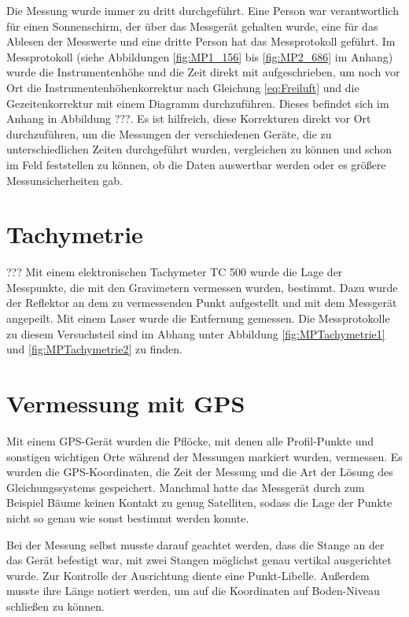 Die Messung wurde immer zu dritt durchgeführt. Eine Person war verantwortlich für einen Sonnenschirm, der über das Messgerät gehalten wurde, eine für das Ablesen der Messwerte 
und eine dritte Person hat das Messprotokoll geführt. Im Messprotokoll (siehe Abbildungen \ref{fig:MP1_156} bis \ref{fig:MP2_686} im Anhang) wurde die Instrumentenhöhe und die Zeit direkt mit aufgeschrieben, um noch vor Ort die Instrumentenhöhenkorrektur nach Gleichung \eqref{eq:Freiluft} und die Gezeitenkorrektur mit einem Diagramm durchzuführen. Dieses befindet sich im Anhang in Abbildung ???. Es ist hilfreich, diese Korrekturen direkt vor Ort durchzuführen, um die Messungen der verschiedenen Geräte, die zu unterschiedlichen Zeiten durchgeführt wurden, vergleichen zu können und schon im Feld feststellen zu können, ob die Daten auswertbar werden oder es größere Messunsicherheiten gab.

\section{Tachymetrie}???
Mit einem elektronischen Tachymeter TC 500 wurde die Lage der Messpunkte, die mit den Gravimetern vermessen wurden, bestimmt. Dazu wurde der Reflektor an dem zu vermessenden Punkt aufgestellt und mit dem Messgerät angepeilt. Mit einem Laser wurde die Entfernung gemessen. Die Messprotokolle zu diesem Versuchsteil sind im Abhang unter Abbildung \ref{fig:MPTachymetrie1} und \ref{fig:MPTachymetrie2} zu finden.

\section{Vermessung mit GPS}

Mit einem GPS-Gerät wurden die Pflöcke, mit denen alle Profil-Punkte und sonstigen wichtigen Orte während der Messungen markiert wurden, vermessen. Es wurden die GPS-Koordinaten, die Zeit der Messung und die Art der Lösung des Gleichungssystems gespeichert. Manchmal hatte das Messgerät durch zum Beispiel Bäume keinen Kontakt zu genug Satelliten, sodass die Lage der Punkte nicht so genau wie sonst bestimmt werden konnte.

Bei der Messung selbst musste darauf geachtet werden, dass die Stange an der das Gerät befestigt war, mit zwei Stangen möglichst genau vertikal ausgerichtet wurde. Zur Kontrolle der Ausrichtung diente eine Punkt-Libelle. Außerdem musste ihre Länge notiert werden, um auf die Koordinaten auf Boden-Niveau schließen zu können.